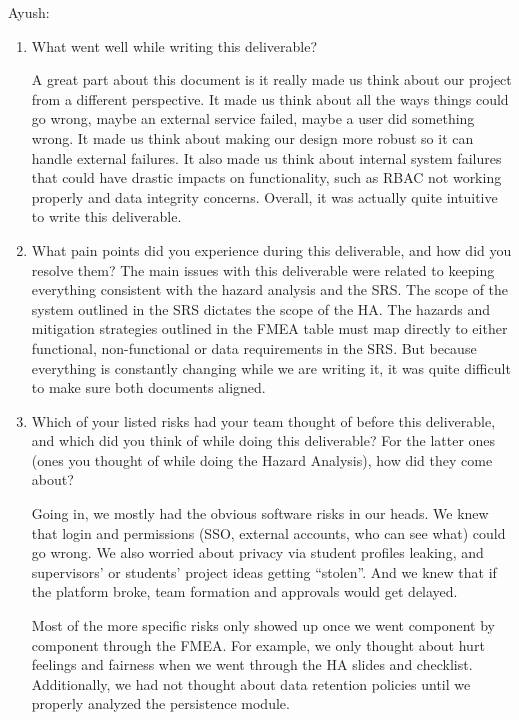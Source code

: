 \documentclass{article}
\begin{document}
Ayush:
\begin{enumerate}
    \item What went well while writing this deliverable?

    A great part about this document is it really made us think about our project from a different
    perspective. It made us think about all the ways things could go wrong, maybe an external service failed,
    maybe a user did something wrong. It made us think about making our design more robust so it can handle external
    failures.
    It also made us think about internal system failures that could have drastic impacts on functionality, such as RBAC
    not working properly and data integrity concerns.
    Overall, it was actually quite intuitive to write this deliverable.

    \item What pain points did you experience during this deliverable, and how
    did you resolve them?
    The main issues with this deliverable were related to keeping everything consistent with the hazard analysis
    and the SRS. The scope of the system outlined in the SRS dictates the scope of the HA. The hazards and mitigation
    strategies outlined in the FMEA table must map directly to either functional, non-functional or data requirements
    in the SRS. But because everything is constantly changing while we are writing it, it was quite difficult to
    make sure both documents aligned.

    \item Which of your listed risks had your team thought of before this
    deliverable, and which did you think of while doing this deliverable? For
    the latter ones (ones you thought of while doing the Hazard Analysis), how
    did they come about?

    Going in, we mostly had the obvious software risks in our heads.
    We knew that login and permissions (SSO, external accounts, who can see what) could go wrong.
    We also worried about privacy via student profiles leaking, and supervisors’ or students’ project ideas getting “stolen”.
    And we knew that if the platform broke, team formation and approvals would get delayed.

    Most of the more specific risks only showed up once we went component by component through the FMEA.
    For example, we only thought about hurt feelings and fairness when we went through the HA slides and checklist.
    Additionally, we had not thought about data retention policies until we properly analyzed the persistence module.


\end{enumerate}
\end{document}
